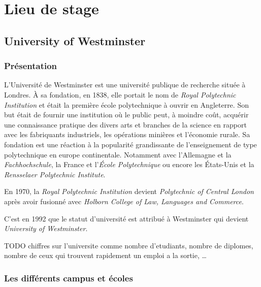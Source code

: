 \chapter{Lieu de stage}

\section{University of Westminster}

\subsection{Pr\'esentation}

{}

L'Universit\'e de Westminster est une universit\'e publique de recherche situ\'ee \`a Londres. 
\`A sa fondation, en 1838, elle portait le nom de \textit{Royal Polytechnic Institution} et \'etait la premi\`ere \'ecole polytechnique \`a ouvrir en Angleterre.
Son but \'etait de fournir une institution o\`u le public peut, \`a moindre co\^ut, acqu\'erir une connaissance pratique des divers arts et branches de la science en rapport avec les fabriquants industriels, les op\'erations mini\`eres et l'\'economie rurale.
Sa fondation est une r\'eaction \`a la popularit\'e grandissante de l'enseignement de type polytechnique en europe continentale. 
Notamment avec l'Allemagne et la \textit{Fachhochschule}, la France et l'\textit{\'Ecole Polytechnique} ou encore les \'Etats-Unis et la \textit{Rensselaer Polytechnic Institute}.

En 1970, la \textit{Royal Polytechnic Institution} devient \textit{Polytechnic of Central London} apr\`es avoir fusionn\'e avec \textit{Holborn College of Law, Languages and Commerce}.

C'est en 1992 que le statut d'universit\'e est attribu\'e \`a Westminster qui devient \textit{University of Westminster}.

 TODO chiffres sur l'universite comme nombre d'etudiants, nombre de diplomes, nombre de ceux qui trouvent rapidement un emploi a la sortie, \ldots

\subsection{Les diff\'erents campus et \'ecoles}

